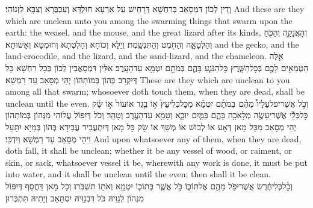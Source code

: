 {וְדֵין לְכוֹן דִּמְסָאַב בְּרִחְשָׁא דְּרָחֵישׁ עַל אַרְעָא חוּלְדָּא וְעַכְבְּרָא וְצַבָּא לִזְנוֹהִי׃}
{And these are they which are unclean unto you among the swarming things that swarm upon the earth: the weasel, and the mouse, and the great lizard after its kinds,}{}
{וְהָאֲנָקָ֥ה וְהַכֹּ֖חַ וְהַלְּטָאָ֑ה וְהַחֹ֖מֶט וְהַתִּנְשָֽׁמֶת׃}
{וְיַלָּא וְכוֹחָא וְהַלְטְתָא וְחוּמְטָא וְאָשׁוּתָא׃}
{and the gecko, and the land-crocodile, and the lizard, and the sand-lizard, and the chameleon.}{}
{אֵ֛לֶּה הַטְּמֵאִ֥ים לָכֶ֖ם בְּכׇל\maqqaf הַשָּׁ֑רֶץ כׇּל\maqqaf הַנֹּגֵ֧עַ בָּהֶ֛ם בְּמֹתָ֖ם יִטְמָ֥א עַד\maqqaf הָעָֽרֶב׃}
{אִלֵּין דִּמְסָאֲבִין לְכוֹן בְּכָל רִחְשָׁא כָּל דְּיִקְרַב בְּהוֹן בְּמוֹתְהוֹן יְהֵי מְסָאַב עַד רַמְשָׁא׃}
{These are they which are unclean to you among all that swarm; whosoever doth touch them, when they are dead, shall be unclean until the even.}{}
{וְכֹ֣ל אֲשֶׁר\maqqaf יִפֹּל\maqqaf עָלָיו֩ מֵהֶ֨ם \pasek  בְּמֹתָ֜ם יִטְמָ֗א מִכׇּל\maqqaf כְּלִי\maqqaf עֵץ֙ א֣וֹ בֶ֤גֶד אוֹ\maqqaf עוֹר֙ א֣וֹ שָׂ֔ק כׇּל\maqqaf כְּלִ֕י אֲשֶׁר\maqqaf יֵעָשֶׂ֥ה מְלָאכָ֖ה בָּהֶ֑ם בַּמַּ֧יִם יוּבָ֛א וְטָמֵ֥א עַד\maqqaf הָעֶ֖רֶב וְטָהֵֽר׃}
{וְכֹל דְּיִפּוֹל עֲלוֹהִי מִנְּהוֹן בְּמוֹתְהוֹן יְהֵי מְסָאַב מִכָּל מָאן דְּאָע אוֹ לְבוּשׁ אוֹ מְשַׁךְ אוֹ שָׂק כָּל מָאן דְּיִתְעֲבֵיד עֲבִידָא בְּהוֹן בְּמַיָּא יִתָּעַל וִיהֵי מְסָאַב עַד רַמְשָׁא וְיִדְכֵּי׃}
{And upon whatsoever any of them, when they are dead, doth fall, it shall be unclean; whether it be any vessel of wood, or raiment, or skin, or sack, whatsoever vessel it be, wherewith any work is done, it must be put into water, and it shall be unclean until the even; then shall it be clean.}{}
{וְכׇ֨ל\maqqaf כְּלִי\maqqaf חֶ֔רֶשׂ אֲשֶׁר\maqqaf יִפֹּ֥ל מֵהֶ֖ם אֶל\maqqaf תּוֹכ֑וֹ כֹּ֣ל אֲשֶׁ֧ר בְּתוֹכ֛וֹ יִטְמָ֖א וְאֹת֥וֹ תִשְׁבֹּֽרוּ׃}
{וְכָל מָאן דַּחֲסַף דְּיִפּוֹל מִנְּהוֹן לְגַוֵּיהּ כֹּל דִּבְגַוֵּיהּ יִסְתָּאַב וְיָתֵיהּ תִּתְבְּרוּן׃}
